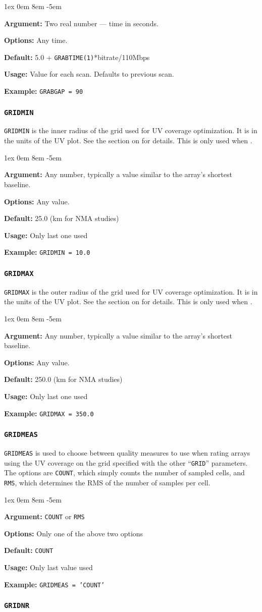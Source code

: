 \documentclass{report}
\newcommand{\rcwbox}[5]{
  \begin{list}{}{\parsep 1ex  \itemsep 0em
                 \leftmargin 8em  \itemindent -5em }
    \item {\bf Argument:} #1
    \item {\bf Options:}  #2
    \item {\bf Default:}  #3
    \item {\bf Usage:}    #4
    \item {\bf Example:}  #5
  \end{list}
}
\begin{document}
\rcwbox
{ Two real number --- time in seconds.}
{ Any time.}
{5.0 + {\tt GRABTIME(1)}*bitrate/110Mbps}
{Value for each scan.  Defaults to previous scan.}
{{\tt GRABGAP = 90 }}

\subsubsection{\label{MP:GRIDMIN}{\tt GRIDMIN}}

{\tt GRIDMIN} is the inner radius of the grid used for UV
coverage optimization.  It is in the units of the UV plot.
See the section on  for details.  This is only used when
.

\rcwbox
{Any number, typically a value similar to the array's shortest baseline.}
{Any value.}
{25.0 (km for NMA studies)}
{Only last one used}
{{\tt GRIDMIN = 10.0}}

\subsubsection{\label{MP:GRIDMAX}{\tt GRIDMAX}}

{\tt GRIDMAX} is the outer radius of the grid used for UV
coverage optimization.  It is in the units of the UV plot.
See the section on  for details.  This is only used when
.

\rcwbox
{Any number, typically a value similar to the array's shortest baseline.}
{Any value.}
{250.0 (km for NMA studies)}
{Only last one used}
{{\tt GRIDMAX = 350.0}}

\subsubsection{\label{MP:GRIDMEAS}{\tt GRIDMEAS}}

{\tt GRIDMEAS} is used to choose between quality measures to use
when rating arrays using the UV coverage on the grid specified
with the other ``{\tt GRID}'' parameters.  The options are
{\tt COUNT}, which simply counts the number of sampled cells,
and {\tt RMS}, which determines the RMS of the number of samples
per cell.

\rcwbox
{{\tt COUNT} or {\tt RMS}}
{Only one of the above two options}
{{\tt COUNT}}
{Only last value used}
{{\tt GRIDMEAS = 'COUNT'}}


\subsubsection{\label{MP:GRIDNR}{\tt GRIDNR}}
\end{document}
